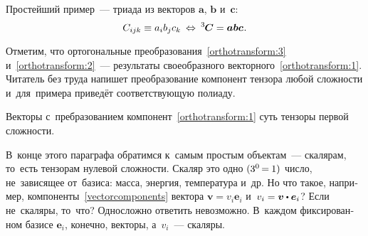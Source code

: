 \begin{otherlanguage}{russian}

Простейший пример~--- триада из векторов $\bm{a}$, $\bm{b}$ и~$\bm{c}$:
\[ C_{ijk} \equiv a_i b_j c_k \:\Leftrightarrow\: {^3\!\!\;\bm{C}} = \bm{a} \bm{b} \bm{c} \hspace{0.1ex}. \]

Отметим, что ортогональные преобразования~\eqref{orthotransform:3} и~\eqref{orthotransform:2}~--- результаты своеобразного  векторного~\eqref{orthotransform:1}. Читатель без труда напишет преобразование компонент тензора любой сложности и~для~примера приведёт соответствующую полиаду.

Векторы с~пребразованием компонент~\eqref{orthotransform:1} суть тензоры первой сложности.

В~конце этого параграфа обратимся к~самым простым объектам~--- скалярам, то~есть тензорам нулевой сложности. Скаляр это одно ${(3^0 \hspace{-0.24ex}=\hspace{-0.12ex} 1)}$ число, не~зависящее от~базиса: масса, энергия, температура и~др. Но что такое, например, компоненты~\eqref{vectorcomponents} вектора ${\bm{v} = v_i \bm{e}_i}$ и~${v_i = \bm{v} \dotp \bm{e}_i}$? Если не~скаляры, то~что? Односложно ответить невозможно. В~каждом фиксированном базисе ${\bm{e}_i}$, конечно, векторы, а~${v_i}$~--- скаляры.

\end{otherlanguage}



\label{para:tensoractions}



